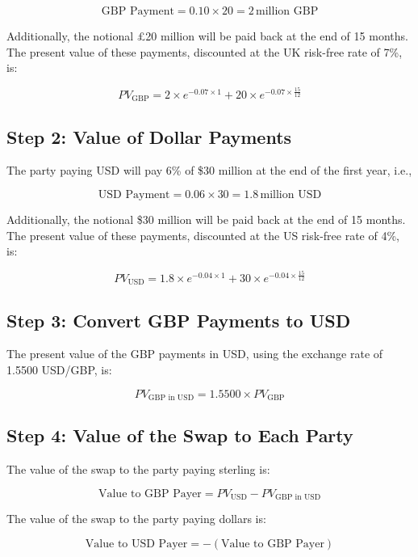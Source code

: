 \documentclass[12pt,letterpaper, onecolumn]{exam}
\begin{document}
\begin{questions}
\begin{solution}
\[
\text{GBP Payment} = 0.10 \times 20 = 2 \, \text{million GBP}
\]

Additionally, the notional £20 million will be paid back at the end of 15 months. The present value of these payments, discounted at the UK risk-free rate of 7\%, is:

\[
PV_{\text{GBP}} = 2 \times e^{-0.07 \times 1} + 20 \times e^{-0.07 \times \frac{15}{12}}
\]

\subsection*{Step 2: Value of Dollar Payments}

The party paying USD will pay 6\% of \$30 million at the end of the first year, i.e.,

\[
\text{USD Payment} = 0.06 \times 30 = 1.8 \, \text{million USD}
\]

Additionally, the notional \$30 million will be paid back at the end of 15 months. The present value of these payments, discounted at the US risk-free rate of 4\%, is:

\[
PV_{\text{USD}} = 1.8 \times e^{-0.04 \times 1} + 30 \times e^{-0.04 \times \frac{15}{12}}
\]

\subsection*{Step 3: Convert GBP Payments to USD}

The present value of the GBP payments in USD, using the exchange rate of 1.5500 USD/GBP, is:

\[
PV_{\text{GBP in USD}} = 1.5500 \times PV_{\text{GBP}}
\]

\subsection*{Step 4: Value of the Swap to Each Party}

The value of the swap to the party paying sterling is:

\[
\text{Value to GBP Payer} = PV_{\text{USD}} - PV_{\text{GBP in USD}}
\]

The value of the swap to the party paying dollars is:

\[
\text{Value to USD Payer} = -(\text{Value to GBP Payer})
\]


\end{solution}


    \pagebreak %
    

\end{questions}
\end{document}
